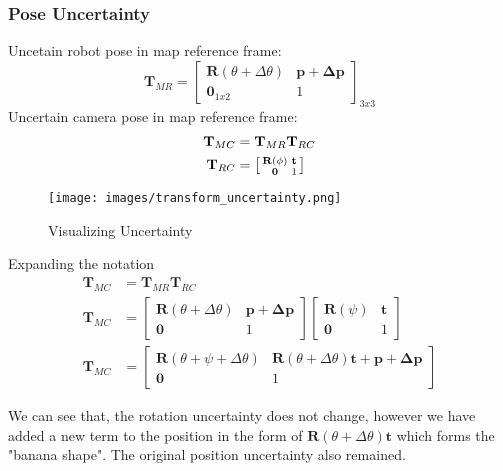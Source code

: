 \subsubsection{Pose Uncertainty}
Uncetain robot pose in map reference frame:
\begin{equation}
  \mathbf{T}_{MR} = \begin{bmatrix} \mathbf{R}(\theta + \Delta \theta) & \mathbf{p}+\mathbf{\Delta p} \\ \mathbf{0}_{1x2} & 1 \end{bmatrix}_{3x3}
\end{equation}
Uncertain camera pose in map reference frame:
\begin{align}
  \mathbf{T}_{MC} &= \mathbf{T}_{MR} \mathbf{T}_{RC} \\
  \mathbf{T}_{RC} &= \begin{bsmallmatrix} \mathbf{R}(\phi) & \mathbf{t} \\ \mathbf{0} & 1 \end{bsmallmatrix}
\end{align}
\begin{figure}[H]
  \begin{center}
    \texttt{[image: images/transform\_uncertainty.png]}
  \end{center}
  \caption{Visualizing Uncertainty}\label{fig:Visualizing Uncertainty}
\end{figure}

Expanding the notation
\begin{align*}
  \mathbf{T}_{MC} &= \mathbf{T}_{MR} \mathbf{T}_{RC} \\
  \mathbf{T}_{MC} & = \begin{bmatrix} \mathbf{R}(\theta + \Delta \theta) & \mathbf{p}+\mathbf{\Delta p} \\ \mathbf{0} & 1 \end{bmatrix} \begin{bmatrix} \mathbf{R}(\psi) & \mathbf{t} \\ \mathbf{0} & 1 \end{bmatrix} \\
  \mathbf{T}_{MC} & = \begin{bmatrix} \mathbf{R}(\theta + \psi + \Delta \theta) & \mathbf{R}(\theta + \Delta \theta)\mathbf{t} + \mathbf{p}+\mathbf{\Delta p} \\ \mathbf{0} & 1 \end{bmatrix}
\end{align*}

We can see that, the rotation uncertainty does not change, however we have added a new term to the position in the form of $ \mathbf{R}(\theta + \Delta \theta)\mathbf{t}$ which forms the "banana shape". The original position uncertainty also remained.\\

